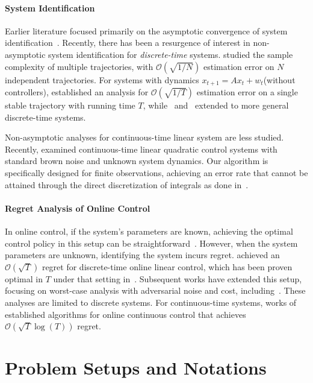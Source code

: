 \documentclass{article}
\theoremstyle{definition}
\begin{document}
\paragraph{System Identification} 
Earlier literature focused primarily on the asymptotic convergence of system identification~\citep{campi1998adaptive, ljung1998system}. Recently, there has been a resurgence of interest in non-asymptotic system identification for \emph{discrete-time} systems. \cite{ref5} studied the sample complexity of multiple trajectories, with $\mathcal{O}(\sqrt{1/N})$ estimation error on $N$ independent trajectories. For systems with dynamics $x_{t+1}=Ax_{t}+w_{t}$(without  controllers),
\cite{ref4} established an analysis for $\mathcal{O}(\sqrt{1/T})$ estimation error on a single stable trajectory with running time $T$, while~\cite{ref29} and~\cite{ref23} extended to more general discrete-time systems. 

Non-asymptotic analyses for continuous-time linear system are less studied. Recently, \cite{ref3} examined continuous-time
linear quadratic control systems with standard brown noise and unknown system dynamics. Our algorithm is specifically designed for finite observations, achieving an error rate that cannot be attained through the direct discretization of integrals as done in~\citep{ref3}. 

\paragraph{Regret Analysis of Online Control}
In  online control, if the system's parameters are known, achieving the optimal control policy in this setup can be straightforward~\citep{ref18,ref24}. However, when the system parameters are unknown, identifying the system incurs regret. \cite{abbasi2011regret} achieved an $\mathcal{O}(\sqrt{T})$ regret for discrete-time online linear control, which has been proven optimal in $T$ under that setting in~\cite{ref7}. Subsequent works have extended this setup, focusing on worst-case analysis with adversarial noise and cost, including~\citep{mania2019certainty,cohen2019learning,lale2020explore,ref7, ref30}. These analyses are limited to discrete systems. For continuous-time systems, 
works of \cite{shirani2022thompson,ref1,li2024online} established algorithms for online continuous control that achieves $\mathcal{O}\left(\sqrt{T}\log(T)\right)$ regret.

\section{Problem Setups and Notations}\label{section: problem setting}
\end{document}
